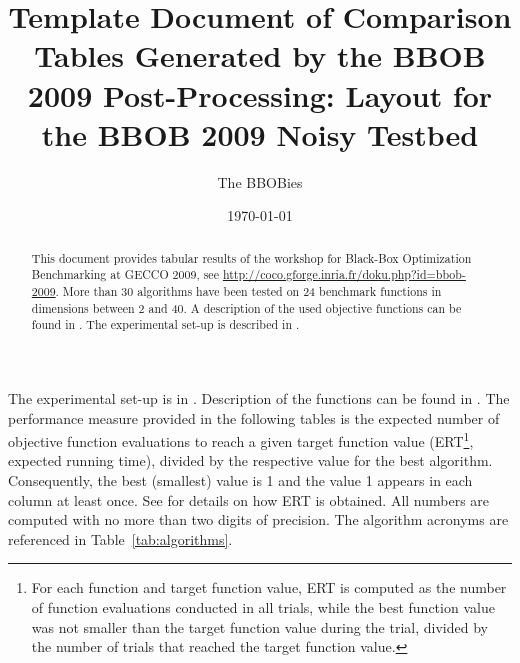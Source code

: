 \documentclass[a4paper,10pt]{article}
\title{Template Document of Comparison Tables Generated by the BBOB 2009
Post-Processing: Layout for the BBOB 2009 Noisy Testbed}
\author{The BBOBies}
\date{\today}
\begin{document}
\maketitle

\begin{abstract}
This document provides tabular results of the workshop for Black-Box Optimization Benchmarking at GECCO 2009, see \url{http://coco.gforge.inria.fr/doku.php?id=bbob-2009}. More than 30 algorithms have been tested on 24 benchmark functions in dimensions between 2 and 40. A description of the used objective functions can be found in \cite{hansen2009noi, wp200902}. The experimental set-up is described in \cite{hansen2009exp}.
\end{abstract}

The experimental set-up is in \cite{hansen2009exp}. Description of the functions can be found in \cite{hansen2009noi, wp200902}.
The performance measure provided in the following tables is the expected number of objective function evaluations to reach a given target function value (ERT\footnote{For each function and target function value, ERT is computed as the number of function evaluations conducted in all trials, while the best function value was not smaller than the target function value during the trial, divided by the number of trials that reached the target function value.}, expected running time), divided by the respective value for the best algorithm. Consequently, the best (smallest) value is 1 and the value 1 appears in each column at least once. See \cite{hansen2009exp} for details on how ERT is obtained. All numbers are computed with no more than two digits of precision. The algorithm acronyms are referenced in Table~\ref{tab:algorithms}.
\end{document}
